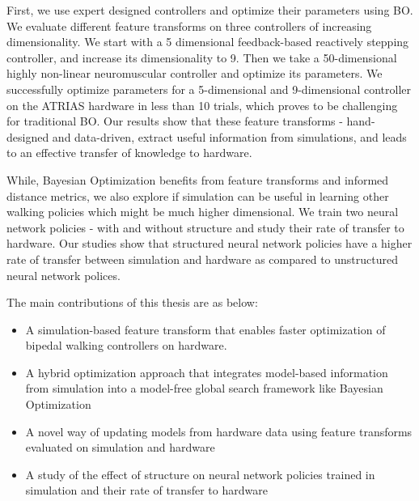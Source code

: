 First, we use expert designed controllers and optimize their parameters using BO. We evaluate different feature transforms on three  controllers of increasing dimensionality. We start with a 5 dimensional feedback-based reactively stepping controller, and increase its dimensionality to 9. Then we take a 50-dimensional highly non-linear neuromuscular controller and optimize its parameters. We successfully optimize parameters for a 5-dimensional and 9-dimensional controller on the ATRIAS hardware in less than 10 trials, which proves to be challenging for traditional BO. Our results show that these feature transforms - hand-designed and data-driven, extract useful information from simulations, and leads to an effective transfer of knowledge to hardware. 

While, Bayesian Optimization benefits from feature transforms and informed distance metrics, we also explore if simulation can be useful in learning other walking policies which might be much higher dimensional. We train two neural network policies - with and without structure and study their rate of transfer to hardware. Our studies show that structured neural network policies have a higher rate of transfer between simulation and hardware as compared to unstructured neural network polices.

The main contributions of this thesis are as below:
\begin{itemize}
    \item A simulation-based feature transform that enables faster optimization of bipedal walking controllers on hardware.
    \item A hybrid optimization approach that integrates model-based information from simulation into a model-free global search framework like Bayesian Optimization
    \item A novel way of updating models from hardware data using feature transforms evaluated on simulation and hardware
    \item A study of the effect of structure on neural network policies trained in simulation and their rate of transfer to hardware
\end{itemize}

